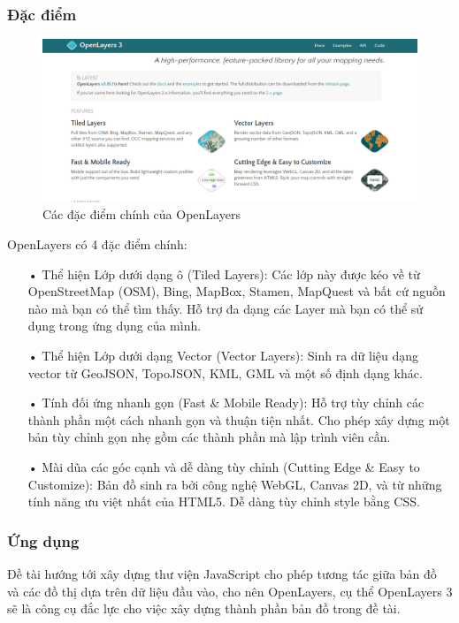 \documentclass[12pt,a4paper,oneside]{article}
\begin{document}
\subsubsection{Đặc điểm}
    \begin{figure}[htp]
		\begin{center}
     	\includegraphics[scale=.4]{image/ol-feature}
    	\caption{Các đặc điểm chính của OpenLayers}
    	\label{refhinh15}
		\end{center}
    \end{figure}
OpenLayers có 4 đặc điểm chính:
\begin{itemize}
\item[•]Thể hiện Lớp dưới dạng ô (Tiled Layers): 
Các lớp này được kéo về từ OpenStreetMap (OSM), Bing, MapBox, Stamen, MapQuest và bất cứ nguồn nào mà bạn có thể tìm thấy. Hỗ trợ đa dạng các Layer mà bạn có thể sử dụng trong ứng dụng của mình.

\item[•]Thể hiện Lớp dưới dạng Vector (Vector Layers):
Sinh ra dữ liệu dạng vector từ GeoJSON, TopoJSON, KML, GML và một số định dạng khác.

\item[•]Tính đối ứng nhanh gọn (Fast \& Mobile Ready):
Hỗ trợ tùy chỉnh các thành phần một cách nhanh gọn và thuận tiện nhất. Cho phép xây dựng một bản tùy chỉnh gọn nhẹ gồm các thành phần mà lập trình viên cần.

\item[•]Mài dũa các góc cạnh và dễ dàng tùy chỉnh (Cutting Edge \& Easy to Customize):
Bản đồ sinh ra bởi công nghệ WebGL, Canvas 2D, và từ những tính năng ưu việt nhất của HTML5. Dễ dàng tùy chỉnh style bằng CSS.

\end{itemize}

\subsubsection{Ứng dụng}
Đề tài hướng tới xây dựng thư viện JavaScript cho phép tương tác giữa bản đồ và các đồ thị dựa trên dữ liệu đầu vào, cho nên OpenLayers, cụ thể OpenLayers 3 sẽ là công cụ đắc lực cho việc xây dựng thành phần bản đồ trong đề tài. 
\end{document}
